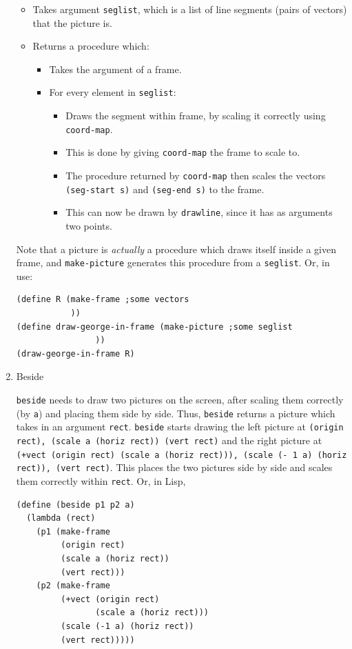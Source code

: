 \documentclass[9pt]{report}
\begin{document}
\begin{enumerate}
\begin{itemize}
\item Takes argument \texttt{seglist}, which is a list of line segments
(pairs of vectors) that the picture is.
\item Returns a procedure which:
\begin{itemize}
\item Takes the argument of a frame.
\item For every element in \texttt{seglist}:
\begin{itemize}
\item Draws the segment within frame, by scaling it correctly
using \texttt{coord-map}.
\item This is done by giving \texttt{coord-map} the frame to scale
to.
\item The procedure returned by \texttt{coord-map} then scales the
vectors \texttt{(seg-start s)} and \texttt{(seg-end s)} to the frame.
\item This can now be drawn by \texttt{drawline}, since it has as
arguments two points.
\end{itemize}
\end{itemize}
\end{itemize}

Note that a picture is \emph{actually} a procedure which draws itself
inside a given frame, and \texttt{make-picture} generates this
procedure from a \texttt{seglist}. Or, in use:

\begin{verbatim}
(define R (make-frame ;some vectors
           ))
(define draw-george-in-frame (make-picture ;some seglist
                ))
(draw-george-in-frame R)
\end{verbatim}

\item Beside
\label{sec:orgf3f231c}

\texttt{beside} needs to draw two pictures on the screen, after scaling
them correctly (by \texttt{a}) and placing them side by side. Thus,
\texttt{beside} returns a picture which takes in an argument \texttt{rect}.
\texttt{beside} starts drawing the left picture at \texttt{(origin rect),
     (scale a (horiz rect)) (vert rect)} and the right picture at
\texttt{(+vect (origin rect) (scale a (horiz rect))), (scale (- 1 a)
     (horiz rect)), (vert rect)}. This places the two pictures side by
side and scales them correctly within \texttt{rect}. Or, in Lisp,

\begin{verbatim}
(define (beside p1 p2 a)
  (lambda (rect)
    (p1 (make-frame
         (origin rect)
         (scale a (horiz rect))
         (vert rect)))
    (p2 (make-frame
         (+vect (origin rect)
                (scale a (horiz rect)))
         (scale (-1 a) (horiz rect))
         (vert rect)))))
\end{verbatim}


\end{enumerate}
\end{document}
